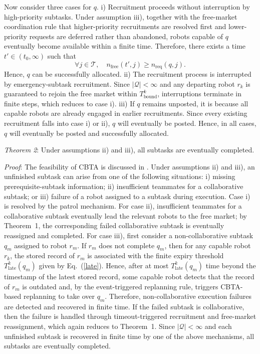 \documentclass[lettersize,journal]{IEEEtran}
\begin{document}
Now consider three cases for $q$. i) Recruitment proceeds without interruption by high-priority subtasks. Under assumption iii), together with the free-market coordination rule that higher-priority recruitments are resolved first and lower-priority requests are deferred rather than abandoned, robots capable of $q$ eventually become available within a finite time. Therefore, there exists a time $t' \in (t_0,\infty)$ such that
\begin{equation*}
\forall j \in \mathcal{T}, \quad n_{\mathrm{free}}(t',j) \ge n_{\mathrm{req}}(q,j).
\end{equation*}
Hence, $q$ can be successfully allocated. ii) The recruitment process is interrupted by emergency-subtask recruitment. Since $|\mathcal{Q}|<\infty$ and any departing robot $r_k$ is guaranteed to rejoin the free market within $T_{\mathrm{bound}}^k$, interruptions terminate in finite steps, which reduces to case i). iii) If $q$ remains unposted, it is because all capable robots are already engaged in earlier recruitments. Since every existing recruitment falls into case i) or ii), $q$ will eventually be posted. Hence, in all cases, $q$ will eventually be posted and successfully allocated.

\textit{Theorem 2}: Under assumptions ii) and iii), all subtasks are eventually completed.

\textit{Proof}: The feasibility of CBTA is discussed in \cite{wang2022consensus}. Under assumptions ii) and iii), an unfinished subtask can arise from one of the following situations: i) missing prerequisite-subtask information; ii) insufficient teammates for a collaborative subtask; or iii) failure of a robot assigned to a subtask during execution.
Case i) is resolved by the patrol mechanism. For case ii), insufficient teammates for a collaborative subtask eventually lead the relevant robots to the free market; by Theorem~1, the corresponding failed collaborative subtask is eventually reassigned and completed.
For case iii), first consider a non-collaborative subtask $q_m$ assigned to robot $r_m$. If $r_m$ does not complete $q_m$, then for any capable robot $r_k$, the stored record of $r_m$ is associated with the finite expiry threshold $T_{\mathrm{late}}^k(q_m)$ given by Eq.~(\ref{late}). Hence, after at most $T_{\mathrm{late}}^k(q_m)$ time beyond the timestamp of the latest stored record, some capable robot detects that the record of $r_m$ is outdated and, by the event-triggered replanning rule, triggers CBTA-based replanning to take over $q_m$. Therefore, non-collaborative execution failures are detected and recovered in finite time. If the failed subtask is collaborative, then the failure is handled through timeout-triggered recruitment and free-market reassignment, which again reduces to Theorem~1. Since $|\mathcal{Q}|<\infty$ and each unfinished subtask is recovered in finite time by one of the above mechanisms, all subtasks are eventually completed.
\end{document}
